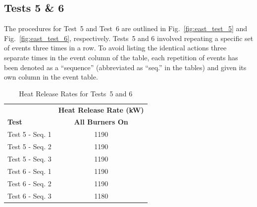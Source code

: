 \documentclass[12pt,oneside]{book}
\begin{document}
\subsection{Tests 5 \& 6}
The procedures for Test~5 and Test~6 are outlined in Fig.~\ref{fig:east_test_5} and Fig.~\ref{fig:east_test_6}, respectively. Tests~5 and 6 involved repeating a specific set of events three times in a row. To avoid listing the identical actions three separate times in the event column of the table, each repetition of events has been denoted as a ``sequence'' (abbreviated as ``seq.'' in the tables) and given its own column in the event table. 

\begin{table}[!ht]
\caption{Heat Release Rates for Tests~5 and 6}
\begin{tabular}{lc}
 \toprule
 & \textbf{Heat Release Rate (kW)} \\
\textbf{Test} & \textbf{All Burners On} \\
\midrule
Test 5 - Seq. 1		& 1190 \\
Test 5 - Seq. 2		& 1190 \\
Test 5 - Seq. 3		& 1190 \\
Test 6 - Seq. 1		& 1190 \\
Test 6 - Seq. 2		& 1190 \\
Test 6 - Seq. 3		& 1180 \\
\bottomrule
\end{tabular}
\label{table:HRR_Tests_5-6}
\end{table}
\end{document}
